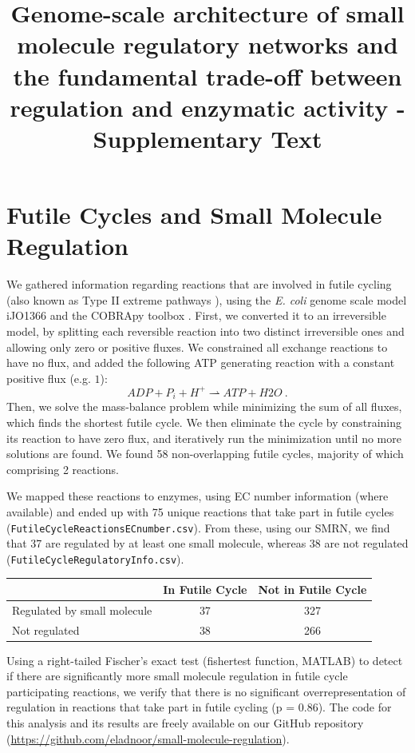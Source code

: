 \documentclass[12pt,a4paper]{article}
\title{Genome-scale architecture of small molecule regulatory networks and the fundamental trade-off between regulation and enzymatic activity - Supplementary Text}
\begin{document}
\date{}
\tableofcontents
\pagebreak
\section{Futile Cycles and Small Molecule Regulation}
We gathered information regarding reactions that are involved in futile cycling (also known as Type II extreme pathways \cite{Price2002-ef}), using the \emph{E. coli} genome scale model iJO1366 \cite{Orth2011-qi} and the COBRApy toolbox \cite{Ebrahim2013-vw}. First, we converted it to an irreversible model, by splitting each reversible reaction into two distinct irreversible ones and allowing only zero or positive fluxes. We constrained all exchange reactions to have no flux, and added the following ATP generating reaction with a constant positive flux (e.g. $1$):
\begin{equation}
ADP + P_i + H^+ \rightharpoonup ATP + H2O~.
\end{equation}
Then, we solve the mass-balance problem while minimizing the sum of all fluxes, which finds the shortest futile cycle. We then eliminate the cycle by constraining its reaction to have zero flux, and iteratively run the minimization until no more solutions are found. We found 58 non-overlapping futile cycles, majority of which comprising 2 reactions.

We mapped these reactions to enzymes, using EC number information (where available) and ended up with 75 unique reactions that take part in futile cycles (\texttt{FutileCycleReactionsECnumber.csv}). From these, using our SMRN, we find that 37 are regulated by at least one small molecule, whereas 38 are not regulated (\texttt{FutileCycleRegulatoryInfo.csv}).

\begin{center}
\begin{tabular}{|l|c|c|}
	\hline
    & In Futile Cycle & Not in Futile Cycle  \\ \hline
Regulated by small molecule & 37 & 327  \\ \hline
Not regulated & 38 & 266 \\ \hline
\end{tabular}
\end{center}

Using a right-tailed Fischer’s exact test (fishertest function, MATLAB) to detect if there are significantly more small molecule regulation in futile cycle participating reactions, we verify that there is no significant overrepresentation of regulation in reactions that take part in futile cycling (p = 0.86).
The code for this analysis and its results are freely available on our GitHub repository (\url{https://github.com/eladnoor/small-molecule-regulation}).
\end{document}
